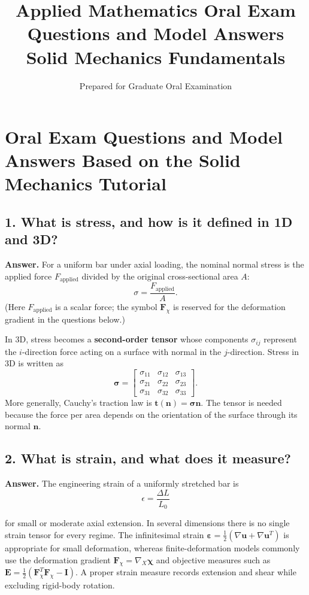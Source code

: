 \documentclass[12pt]{article}
\title{\vspace{-2em}\textbf{Applied Mathematics Oral Exam Questions and Model Answers}\\
\large Solid Mechanics Fundamentals}
\author{Prepared for Graduate Oral Examination}
\date{}
\begin{document}
\section*{Oral Exam Questions and Model Answers Based on the Solid Mechanics Tutorial}

\subsection*{1. What is stress, and how is it defined in 1D and 3D?}

\textbf{Answer.}
For a uniform bar under axial loading, the nominal normal stress is the applied force $F_{\text{applied}}$ divided by the original cross-sectional area $A$:
\[
\sigma = \frac{F_{\text{applied}}}{A}.
\]
(Here $F_{\text{applied}}$ is a scalar force; the symbol $\mathbf F_{\chi}$ is reserved for the deformation gradient in the questions below.)


In 3D, stress becomes a \textbf{second-order tensor} whose components 
$\sigma_{ij}$ represent the $i$-direction force acting on a surface with 
normal in the $j$-direction. Stress in 3D is written as
\[
\boldsymbol{\sigma} =
\begin{bmatrix}
\sigma_{11} & \sigma_{12} & \sigma_{13} \\
\sigma_{21} & \sigma_{22} & \sigma_{23} \\
\sigma_{31} & \sigma_{32} & \sigma_{33}
\end{bmatrix}.
\]
More generally, Cauchy's traction law is $\mathbf t(\mathbf n)=\boldsymbol\sigma\mathbf n$. The tensor is needed because the force per area depends on the orientation of the surface through its normal $\mathbf n$.


\subsection*{2. What is strain, and what does it measure?}

\textbf{Answer.}
The engineering strain of a uniformly stretched bar is
\[
\epsilon = \frac{\Delta L}{L_0}
\]


for small or moderate axial extension. In several dimensions there is no single strain tensor for every regime. The infinitesimal strain $\boldsymbol\varepsilon=\tfrac12(\nabla\mathbf u+\nabla\mathbf u^T)$ is appropriate for small deformation, whereas finite-deformation models commonly use the deformation gradient $\mathbf F_{\chi}=\nabla_X\boldsymbol\chi$ and objective measures such as $\mathbf E=\tfrac12(\mathbf F_{\chi}^T\mathbf F_{\chi}-\mathbf I)$. A proper strain measure records extension and shear while excluding rigid-body rotation.
\end{document}
